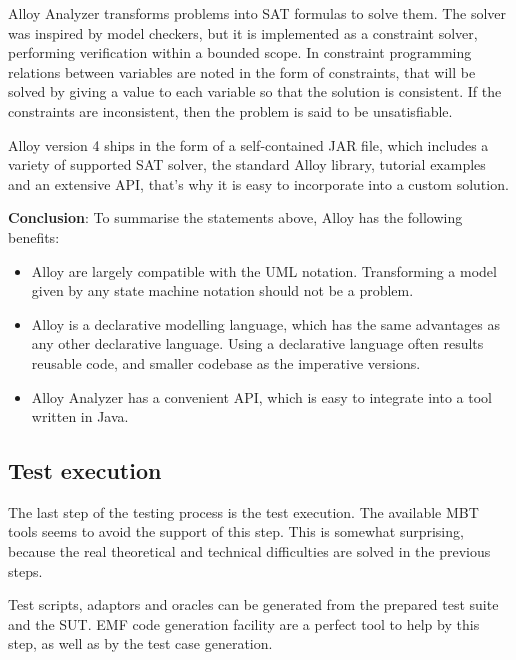 Alloy Analyzer transforms problems into SAT formulas to solve them. The solver was inspired by model checkers, but it is implemented as a constraint solver, performing verification within a bounded scope. In constraint programming relations between variables are noted in the form of constraints, that will be solved by giving a value to each variable so that the solution is consistent. If the constraints are inconsistent, then the problem is said to be unsatisfiable.

Alloy version 4 ships in the form of a self-contained JAR file, which includes a variety of supported SAT solver, the standard Alloy library, tutorial examples and an extensive API, that's why it is easy to incorporate into a custom solution.

\textbf{Conclusion}: To summarise the statements above, Alloy has the following benefits:

\begin{itemize}
	\item Alloy are largely compatible with the UML notation. Transforming a model given by any state machine notation should not be a problem.
	\item Alloy is a declarative modelling language, which has the same advantages as any other declarative language. Using a declarative language often results reusable code, and smaller codebase as the imperative versions.
	\item Alloy Analyzer has a convenient API, which is easy to integrate into a tool written in Java.
\end{itemize}



\subsection{Test execution}
\label{sub:designtestgeneration}

The last step of the testing process is the test execution. The available MBT tools seems to avoid the support of this step. This is somewhat surprising, because the real theoretical and technical difficulties are solved in the previous steps.

Test scripts, adaptors and oracles can be generated from the prepared test suite and the SUT. EMF code generation facility are a perfect tool to help by this step, as well as by the test case generation.

